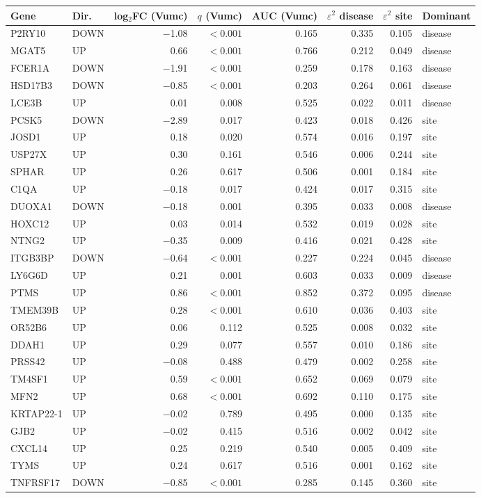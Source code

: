 \footnotesize
\begin{tabular}{llrrrrrl}
\toprule
Gene & Dir. & log$_2$FC (Vumc) & $q$ (Vumc) & AUC (Vumc) & $\varepsilon^2$ disease & $\varepsilon^2$ site & Dominant \\
\midrule
P2RY10 & DOWN & $-$1.08 & $<0.001$ & 0.165 & 0.335 & 0.105 & disease \\
MGAT5 & UP & 0.66 & $<0.001$ & 0.766 & 0.212 & 0.049 & disease \\
FCER1A & DOWN & $-$1.91 & $<0.001$ & 0.259 & 0.178 & 0.163 & disease \\
HSD17B3 & DOWN & $-$0.85 & $<0.001$ & 0.203 & 0.264 & 0.061 & disease \\
LCE3B & UP & 0.01 & 0.008 & 0.525 & 0.022 & 0.011 & disease \\
PCSK5 & DOWN & $-$2.89 & 0.017 & 0.423 & 0.018 & 0.426 & site \\
JOSD1 & UP & 0.18 & 0.020 & 0.574 & 0.016 & 0.197 & site \\
USP27X & UP & 0.30 & 0.161 & 0.546 & 0.006 & 0.244 & site \\
SPHAR & UP & 0.26 & 0.617 & 0.506 & 0.001 & 0.184 & site \\
C1QA & UP & $-$0.18 & 0.017 & 0.424 & 0.017 & 0.315 & site \\
DUOXA1 & DOWN & $-$0.18 & 0.001 & 0.395 & 0.033 & 0.008 & disease \\
HOXC12 & UP & 0.03 & 0.014 & 0.532 & 0.019 & 0.028 & site \\
NTNG2 & UP & $-$0.35 & 0.009 & 0.416 & 0.021 & 0.428 & site \\
ITGB3BP & DOWN & $-$0.64 & $<0.001$ & 0.227 & 0.224 & 0.045 & disease \\
LY6G6D & UP & 0.21 & 0.001 & 0.603 & 0.033 & 0.009 & disease \\
PTMS & UP & 0.86 & $<0.001$ & 0.852 & 0.372 & 0.095 & disease \\
TMEM39B & UP & 0.28 & $<0.001$ & 0.610 & 0.036 & 0.403 & site \\
OR52B6 & UP & 0.06 & 0.112 & 0.525 & 0.008 & 0.032 & site \\
DDAH1 & UP & 0.29 & 0.077 & 0.557 & 0.010 & 0.186 & site \\
PRSS42 & UP & $-$0.08 & 0.488 & 0.479 & 0.002 & 0.258 & site \\
TM4SF1 & UP & 0.59 & $<0.001$ & 0.652 & 0.069 & 0.079 & site \\
MFN2 & UP & 0.68 & $<0.001$ & 0.692 & 0.110 & 0.175 & site \\
KRTAP22-1 & UP & $-$0.02 & 0.789 & 0.495 & 0.000 & 0.135 & site \\
GJB2 & UP & $-$0.02 & 0.415 & 0.516 & 0.002 & 0.042 & site \\
CXCL14 & UP & 0.25 & 0.219 & 0.540 & 0.005 & 0.409 & site \\
TYMS & UP & 0.24 & 0.617 & 0.516 & 0.001 & 0.162 & site \\
TNFRSF17 & DOWN & $-$0.85 & $<0.001$ & 0.285 & 0.145 & 0.360 & site \\
\bottomrule
\end{tabular}
